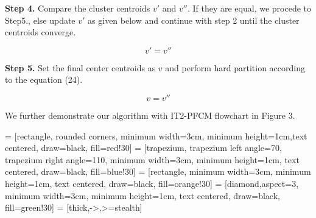 \documentclass[journal, onecolumn]{IEEEtran}
\begin{document}
\textbf{Step 4.}
Compare the cluster centroids $v'$ and $v''$. If they are equal, we procede to Step5., else update $v'$ as given below and continue with step 2 until the cluster centroids converge.

\begin{equation}
v'=v''
\end{equation}

\textbf{Step 5.}
Set the final center centroids as $v$ and perform hard partition according to the equation (24).

\begin{equation}
v=v''
\end{equation}

We further demonstrate our algorithm with IT2-PFCM flowchart in Figure 3.

\vspace{5mm}
 = [rectangle, rounded corners, minimum width=3cm, minimum height=1cm,text centered, draw=black, fill=red!30]
 = [trapezium, trapezium left angle=70, trapezium right angle=110, minimum width=3cm, minimum height=1cm, text centered, draw=black, fill=blue!30]
 = [rectangle, minimum width=3cm, minimum height=1cm, text centered, draw=black, fill=orange!30]
 = [diamond,aspect=3, minimum width=3cm, minimum height=1cm, text centered, draw=black, fill=green!30]
 = [thick,->,>=stealth]
\end{document}
